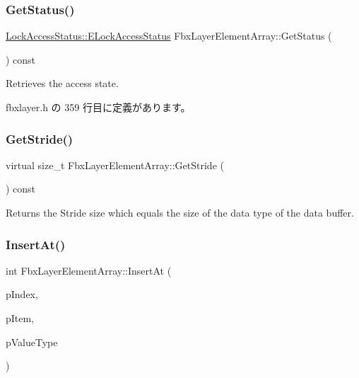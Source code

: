 \mbox{\label{class_fbx_layer_element_array_a5f23239e1ed76a7eab70b031c514167a}} 
\subsubsection{\texorpdfstring{Get\+Status()}{GetStatus()}}
{\footnotesize\ttfamily \hyperlink{class_lock_access_status_a3314dad01b38dd90f5393e108a07b3c1}{Lock\+Access\+Status\+::\+E\+Lock\+Access\+Status} Fbx\+Layer\+Element\+Array\+::\+Get\+Status (\begin{DoxyParamCaption}{ }\end{DoxyParamCaption}) const\hspace{0.3cm}{\ttfamily [inline]}}



Retrieves the access state. 



 fbxlayer.\+h の 359 行目に定義があります。

\mbox{\label{class_fbx_layer_element_array_aca7d58691bf2276171658a6dc382a511}} 
\subsubsection{\texorpdfstring{Get\+Stride()}{GetStride()}}
{\footnotesize\ttfamily virtual size\+\_\+t Fbx\+Layer\+Element\+Array\+::\+Get\+Stride (\begin{DoxyParamCaption}{ }\end{DoxyParamCaption}) const\hspace{0.3cm}{\ttfamily [virtual]}}

Returns the Stride size which equals the size of the data type of the data buffer. \mbox{\label{class_fbx_layer_element_array_ac781bfbc43232bde51bbf04ab543cd13}} 
\subsubsection{\texorpdfstring{Insert\+At()}{InsertAt()}\hspace{0.1cm}{\footnotesize\ttfamily [1/2]}}
{\footnotesize\ttfamily int Fbx\+Layer\+Element\+Array\+::\+Insert\+At (\begin{DoxyParamCaption}\item[{int}]{p\+Index,  }\item[{const void $\ast$}]{p\+Item,  }\item[{\hyperlink{fbxpropertytypes_8h_a73913a5ddfb20e57c6f25e9e6784bd92}{E\+Fbx\+Type}}]{p\+Value\+Type }\end{DoxyParamCaption})}

